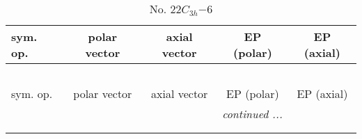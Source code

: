 \documentclass[fleqn,10pt,landscape]{jsarticle}
\begin{document}
\newpage
\begin{center}
\renewcommand{\arraystretch}{1.3}
\begin{longtable}{lcccc}
\caption{No. 22\quad$C_{3h}$\quad$-6$\quad[ hexagonal ]}
 \\
 \hline \hline
sym. op. & polar vector & axial vector & EP (polar) & EP (axial) \\ \hline \endfirsthead

\multicolumn{4}{l}{\tablename\ \thetable{}} \\
 \hline \hline
sym. op. & polar vector & axial vector & EP (polar) & EP (axial) \\ \hline \endhead

 \hline \hline
\multicolumn{4}{r}{\footnotesize\it continued ...} \\ \endfoot

 \hline \hline
\multicolumn{4}{r}{} \\ \endlastfoot


\end{longtable}
\end{center}
\end{document}
